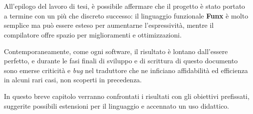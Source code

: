 \chapter{}
\label{chap:6-conclusions}

All'epilogo del lavoro di tesi, è possibile affermare che il progetto è stato portato a termine con un più che discreto successo:
il linguaggio funzionale \textbf{Funx} è molto semplice ma può essere esteso per aumentarne l'espressività,
mentre il compilatore offre spazio per miglioramenti e ottimizzazioni.


Contemporaneamente, come ogni software, il risultato è lontano dall'essere perfetto,
e durante le fasi finali di sviluppo e di scrittura di questo documento sono emerse criticità e \textit{bug}
nel traduttore che ne inficiano affidabilità ed efficienza in alcuni rari casi, non scoperti in precedenza.


In questo breve capitolo verranno confrontati i risultati con gli obiettivi prefissati,
suggerite possibili estensioni per il linguaggio e accennato un uso didattico.



\newpage



